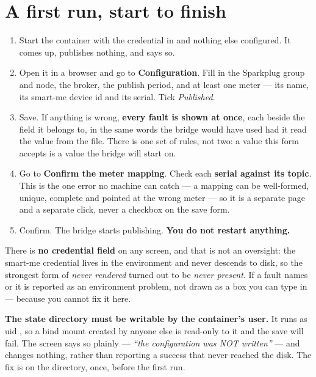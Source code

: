 \section{A first run, start to finish}

\begin{enumerate}
  \item Start the container with the credential in  and nothing else configured.
        It comes up, publishes nothing, and says so.
  \item Open it in a browser and go to \textbf{Configuration}. Fill in the Sparkplug group
        and node, the broker, the publish period, and at least one meter --- its name, its smart-me
        device id and its serial. Tick \emph{Published}.
  \item Save. If anything is wrong, \textbf{every fault is shown at once}, each beside the
        field it belongs to, in the same words the bridge would have used had it read the
        value from the file. There is one set of rules, not two: a value this form accepts
        is a value the bridge will start on.
  \item Go to \textbf{Confirm the meter mapping}. Check each \textbf{serial against its
        topic}. This is the one error no machine can catch --- a mapping can be
        well-formed, unique, complete and pointed at the wrong meter --- so it is a separate
        page and a separate click, never a checkbox on the save form.
  \item Confirm. The bridge starts publishing. \textbf{You do not restart anything.}
\end{enumerate}

\begin{note}
There is \textbf{no credential field} on any screen, and that is not an oversight: the
smart-me credential lives in the environment and never descends to disk, so the strongest
form of \emph{never rendered} turned out to be \emph{never present}. If a fault names
 or  it is reported as an
environment problem, not drawn as a box you can type in --- because you cannot fix it here.
\end{note}

\begin{warning}
\textbf{The state directory must be writable by the container's user.} It runs as uid
, so a bind mount created by anyone else is read-only to it and the save will
fail. The screen says so plainly --- \emph{``the configuration was NOT written''} --- and
changes nothing, rather than reporting a success that never reached the disk. The fix is
 on the directory, once, before the first run.
\end{warning}

